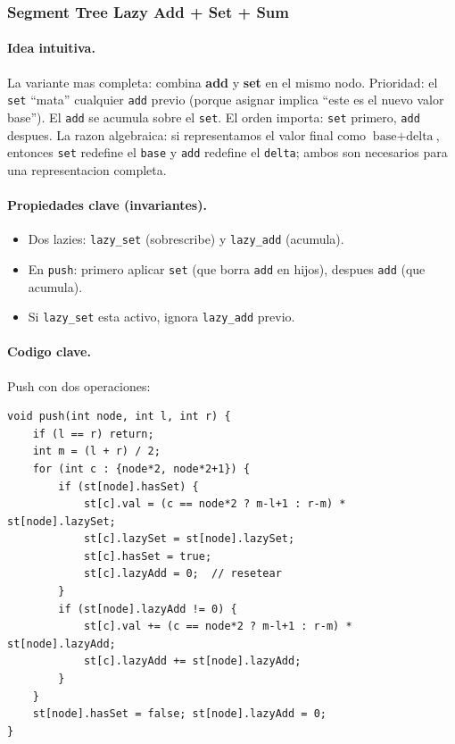 ﻿\subsubsection{Segment Tree Lazy Add + Set + Sum}

\paragraph{Idea intuitiva.}
La variante mas completa: combina \textbf{add} y \textbf{set} en el mismo nodo. Prioridad: el \texttt{set} ``mata'' cualquier \texttt{add} previo (porque asignar implica ``este es el nuevo valor base''). El \texttt{add} se acumula sobre el \texttt{set}. El orden importa: \texttt{set} primero, \texttt{add} despues. La razon algebraica: si representamos el valor final como $\text{base} + \text{delta}$, entonces \texttt{set} redefine el \texttt{base} y \texttt{add} redefine el \texttt{delta}; ambos son necesarios para una representacion completa.

\paragraph{Propiedades clave (invariantes).}
\begin{itemize}\setlength\itemsep{0pt}
	\item Dos lazies: \texttt{lazy\_set} (sobrescribe) y \texttt{lazy\_add} (acumula).
	\item En \texttt{push}: primero aplicar \texttt{set} (que borra \texttt{add} en hijos), despues \texttt{add} (que acumula).
	\item Si \texttt{lazy\_set} esta activo, ignora \texttt{lazy\_add} previo.
\end{itemize}

\paragraph{Codigo clave.}
Push con dos operaciones:
\begin{verbatim}
void push(int node, int l, int r) {
    if (l == r) return;
    int m = (l + r) / 2;
    for (int c : {node*2, node*2+1}) {
        if (st[node].hasSet) {
            st[c].val = (c == node*2 ? m-l+1 : r-m) * st[node].lazySet;
            st[c].lazySet = st[node].lazySet;
            st[c].hasSet = true;
            st[c].lazyAdd = 0;  // resetear
        }
        if (st[node].lazyAdd != 0) {
            st[c].val += (c == node*2 ? m-l+1 : r-m) * st[node].lazyAdd;
            st[c].lazyAdd += st[node].lazyAdd;
        }
    }
    st[node].hasSet = false; st[node].lazyAdd = 0;
}
\end{verbatim}


